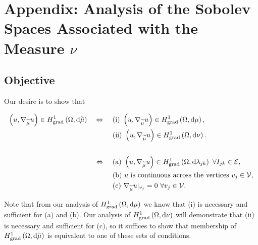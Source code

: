 \section{Appendix: Analysis of the Sobolev Spaces Associated with the Measure $\nu$} \label{app:VertexAnalysis}

\subsection{Objective}
Our desire is to show that
\begin{conjecture} \label{conj:ThickVertexSpaceCharacterisation}
	\begin{align*}
		\left( u, \nabla_{\widetilde{\mu}}u \right)\in H^1_\mathrm{grad}\left( \Omega, \mathrm{d}\widetilde{\mu} \right) \quad\Leftrightarrow\quad
		& \ \text{(i)} \ \left( u, \nabla_{\widetilde{\mu}}u \right)\in H^1_\mathrm{grad}\left( \Omega, \mathrm{d}\mu \right), \\
		& \ \text{(ii)} \ \left( u, \nabla_{\widetilde{\mu}}u \right)\in H^1_\mathrm{grad}\left( \Omega, \mathrm{d}\nu \right). \\
		\\
		\quad\Leftrightarrow\quad
		& \ \text{(a)} \ \left( u, \nabla_{\widetilde{\mu}}u \right)\in H^1_\mathrm{grad}\left( \Omega, \mathrm{d}\lambda_{jk} \right) \ \forall I_{jk}\in\mathcal{E}, \\
		& \ \text{(b)} \ u \text{ is continuous across the vertices} \ v_j\in\mathcal{V}, \\
		& \ \text{(c)} \ \nabla_{\widetilde{\mu}}u\vert_{v_j} = 0 \ \forall v_j\in\mathcal{V}.
	\end{align*}
\end{conjecture}
Note that from our analysis of $H^1_\mathrm{grad}\left( \Omega, \mathrm{d}\mu \right)$ we know that (i) is necessary and sufficient for (a) and (b).
Our analysis of $H^1_\mathrm{grad}\left( \Omega, \mathrm{d}\nu \right)$ will demonstrate that (ii) is necessary and sufficient for (c), so it suffices to show that membership of $H^1_\mathrm{grad}\left( \Omega, \mathrm{d}\widetilde{\mu} \right)$ is equivalent to one of these sets of conditions.


